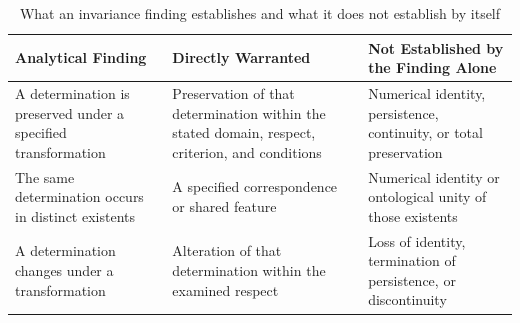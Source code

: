 %
%
%
%
%

\begin{table}[htbp]
    \centering
    \small
    \renewcommand{\arraystretch}{1.35}
    \setlength{\tabcolsep}{5pt}

    \caption{What an invariance finding establishes and what
    it does not establish by itself}
    \label{tab:inferential-limits-of-invariance}

    \begin{tabular}{
        |p{}
        |p{}
        |p{}|
    }
        \hline

        \textbf{Analytical Finding}
        &
        \textbf{Directly Warranted}
        &
        \textbf{Not Established by the Finding Alone}
        \\ \hline

        A determination is preserved under a specified
        transformation
        &
        Preservation of that determination within the
        stated domain, respect, criterion, and conditions
        &
        Numerical identity, persistence, continuity,
        or total preservation
        \\ \hline

        The same determination occurs in distinct existents
        &
        A specified correspondence or shared feature
        &
        Numerical identity or ontological unity of
        those existents
        \\ \hline

        A determination changes under a transformation
        &
        Alteration of that determination within the
        examined respect
        &
        Loss of identity, termination of persistence,
        or discontinuity
        \\ \hline


\end{tabular}
\end{table}

